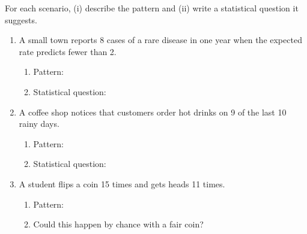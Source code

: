 \documentclass[10pt]{article}
\begin{document}
\vspace{0.1in}

\begin{practicebox}
\small For each scenario, (i) describe the pattern and (ii) write a statistical question it suggests.

\vspace{6pt}
\begin{enumerate}[leftmargin=1.5em, itemsep=12pt]
  \item A small town reports 8 cases of a rare disease in one year when the expected rate
        predicts fewer than 2.
        \begin{enumerate}[label=(\alph*), itemsep=4pt]
          \item Pattern: \blank{9cm}
          \item Statistical question: \writeline
        \end{enumerate}

  \item A coffee shop notices that customers order hot drinks on 9 of the last 10 rainy days.
        \begin{enumerate}[label=(\alph*), itemsep=4pt]
          \item Pattern: \blank{9cm}
          \item Statistical question: \writeline
        \end{enumerate}

  \item A student flips a coin 15 times and gets heads 11 times.
        \begin{enumerate}[label=(\alph*), itemsep=4pt]
          \item Pattern: \blank{9cm}
          \item Could this happen by chance with a fair coin? \blank{4cm}
        \end{enumerate}
\end{enumerate}
\end{practicebox}
\end{document}
